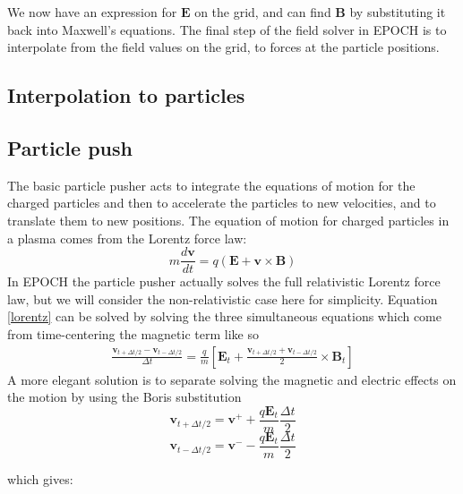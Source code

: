 We now have an expression for $\mathbf{E}$ on the grid, and can find $\mathbf{B}$ by substituting it back into Maxwell's equations. The final step of the field solver in EPOCH is to interpolate from the field values on the grid, to forces at the particle positions.



\subsection{Interpolation to particles}
\subsection{Particle push}
The basic particle pusher acts to integrate the equations of motion for the charged particles and then to accelerate the particles to new velocities, and to translate them to new positions. The equation of motion for charged particles in a plasma comes from the Lorentz force law:
\begin{equation} \label{lorentz}
m \frac{d\mathbf{v}}{dt} = q \left( \mathbf{E} + \mathbf{v} \times \mathbf{B} \right)
\end{equation}
In EPOCH the particle pusher actually solves the full relativistic Lorentz force law, but we will consider the non-relativistic case here for simplicity. Equation \ref{lorentz} can be solved by solving the three simultaneous equations which come from time-centering the magnetic term \citep{Birdsall} like so 
\begin{eqnarray*} \label{timecentred}
\frac{\mathbf{v}_{t+\Delta t/2}-\mathbf{v}_{t-\Delta t/2}}{\Delta t}=\frac{q}{m}\left[\mathbf{E}_t+\frac{\mathbf{v}_{t+\Delta t/2}+\mathbf{v}_{t-\Delta t/2}}{2} \times \mathbf{B}_t\right]
\end{eqnarray*} A more elegant solution is to separate solving the magnetic and electric effects on the motion by using the Boris substitution \citep{Birdsall}
\begin{equation}
\mathbf{v}_{t+\Delta t/2} = \mathbf{v}^{+}+\frac{q\mathbf{E}_t}{m}\frac{\Delta t}{2}
\label{eqhalfE}
\end{equation}
\begin{equation}
\mathbf{v}_{t-\Delta t/2} = \mathbf{v}^{-}-\frac{q\mathbf{E}_t}{m}\frac{\Delta t}{2}
\label{eqhalfE2}
\end{equation}

which gives:

